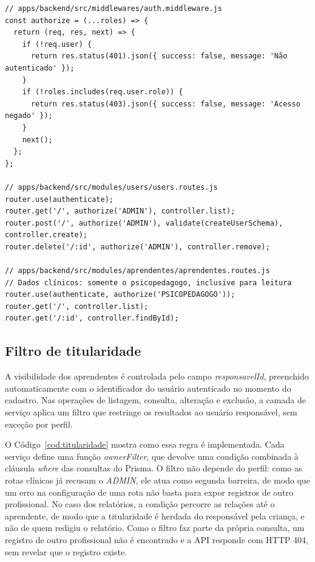 \begin{lstlisting}[caption={Middleware \textit{authorize} e sua aplicação nas rotas de usuários e de aprendentes},label={cod:authorize}]
// apps/backend/src/middlewares/auth.middleware.js
const authorize = (...roles) => {
  return (req, res, next) => {
    if (!req.user) {
      return res.status(401).json({ success: false, message: 'Não autenticado' });
    }
    if (!roles.includes(req.user.role)) {
      return res.status(403).json({ success: false, message: 'Acesso negado' });
    }
    next();
  };
};

// apps/backend/src/modules/users/users.routes.js
router.use(authenticate);
router.get('/', authorize('ADMIN'), controller.list);
router.post('/', authorize('ADMIN'), validate(createUserSchema), controller.create);
router.delete('/:id', authorize('ADMIN'), controller.remove);

// apps/backend/src/modules/aprendentes/aprendentes.routes.js
// Dados clínicos: somente o psicopedagogo, inclusive para leitura
router.use(authenticate, authorize('PSICOPEDAGOGO'));
router.get('/', controller.list);
router.get('/:id', controller.findById);
\end{lstlisting}

\subsection{Filtro de titularidade}

A visibilidade dos aprendentes é controlada pelo campo \textit{responsavelId}, preenchido automaticamente com o identificador do usuário autenticado no momento do cadastro. Nas operações de listagem, consulta, alteração e exclusão, a camada de serviço aplica um filtro que restringe os resultados ao usuário responsável, sem exceção por perfil.

O Código~\ref{cod:titularidade} mostra como essa regra é implementada. Cada serviço define uma função \textit{ownerFilter}, que devolve uma condição combinada à cláusula \textit{where} das consultas do Prisma. O filtro não depende do perfil: como as rotas clínicas já recusam o \textit{ADMIN}, ele atua como segunda barreira, de modo que um erro na configuração de uma rota não basta para expor registros de outro profissional. No caso dos relatórios, a condição percorre as relações até o aprendente, de modo que a titularidade é herdada do responsável pela criança, e não de quem redigiu o relatório. Como o filtro faz parte da própria consulta, um registro de outro profissional não é encontrado e a API responde com HTTP 404, sem revelar que o registro existe.

